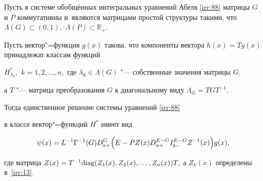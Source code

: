 \begin{theorem}

Пусть в системе обобщённых интегральных уравнений Абеля \eqref{irr:88} матрицы $G$ и $P$ коммутативны и~являются матрицами простой структуры такими{\rm,} что $\Lambda(G)\subset(0, 1),$ $\Lambda(P)\subset\mathbb R_{+}.$ 

Пусть вектор"=функция $g(x)$ такова{\rm,} что компоненты вектора $h(x)=Tg(x)$ принадлежат классам функций 

$H^{*}_{\lambda_{k}},$ $k=1, 2, \ldots, n,$ где $\lambda_{k} \in\Lambda(G)$ "--- собственные значения матрицы $G,$

а $T$ "--- матрица преобразования $G$ к диагональному виду $\Lambda_{G}=TGT^{-1}.$ 

Тогда единственное решение системы уравнений \eqref{irr:88}

в классе вектор"=функций $H^{*}$ имеет вид

$$

\psi(x)=L^{-1}\Gamma^{-1}(G) D^{G}_{a+}\Bigl(E-PZ(x)D^{E-G}_{a+}I^{E-G}_{b-}Z^{-1}(x)\Bigr)g(x),

$$

где матрица $Z(x)=T^{-1}{\rm diag}(Z_{1}(x), Z_{2}(x), \ldots, Z_{n}(x))T,$ а $Z_{k}(x)$ определены в~\eqref{irr:13}\rm.

\end{theorem}














